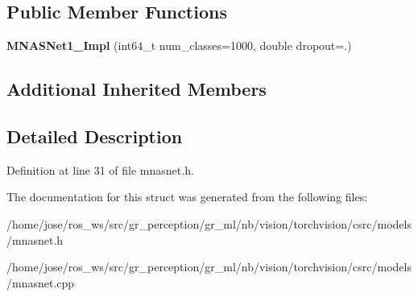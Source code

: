 \subsection*{Public Member Functions}
\begin{DoxyCompactItemize}
\item 
\mbox{\label{structvision_1_1models_1_1MNASNet1__3Impl_ae162b2520c40716a30aa831fb9fef86c}} 
{\bfseries M\+N\+A\+S\+Net1\+\_\+Impl} (int64\+\_\+t num\+\_\+classes=1000, double dropout=.)
\end{DoxyCompactItemize}
\subsection*{Additional Inherited Members}


\subsection{Detailed Description}


Definition at line 31 of file mnasnet.\+h.



The documentation for this struct was generated from the following files\+:\begin{DoxyCompactItemize}
\item 
/home/jose/ros\+\_\+ws/src/gr\+\_\+perception/gr\+\_\+ml/nb/vision/torchvision/csrc/models/mnasnet.\+h\item 
/home/jose/ros\+\_\+ws/src/gr\+\_\+perception/gr\+\_\+ml/nb/vision/torchvision/csrc/models/mnasnet.\+cpp\end{DoxyCompactItemize}
